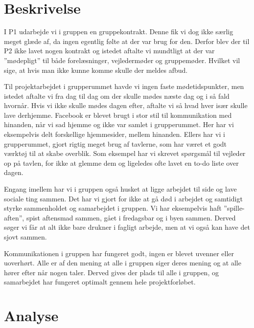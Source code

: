 \section{Beskrivelse}
I P1 udarbejde vi i gruppen en gruppekontrakt. Denne fik vi dog ikke særlig meget glæde af, da ingen egentlig følte at der var brug for den. Derfor blev der til P2 ikke lavet nogen kontrakt og istedet aftalte vi mundtligt at der var ”mødepligt” til både forelæsninger, vejledermøder og gruppemøder. Hvilket vil sige, at hvis man ikke kunne komme skulle der meldes afbud.

Til projektarbejdet i grupperummet havde vi ingen faste mødetidspunkter, men istedet aftalte vi fra dag til dag om der skulle mødes næste dag og i så fald hvornår. Hvis vi ikke skulle mødes dagen efter, aftalte vi så hvad hver især skulle lave derhjemme.
Facebook er blevet brugt i stor stil til kommunikation med hinanden, når vi sad hjemme og ikke var samlet i grupperummet. Her har vi eksempelvis delt forskellige hjemmesider, mellem hinanden. 
Ellers har vi i grupperummet, gjort rigtig meget brug af tavlerne, som har været et godt værktøj til at skabe overblik. Som eksempel har vi skrevet spørgsmål til vejleder op på tavlen, for ikke at glemme dem og ligeledes ofte lavet en to-do liste over dagen. 

Engang imellem har vi i gruppen også husket at ligge arbejdet til side og lave sociale ting sammen. Det har vi gjort for ikke at gå død i arbejdet og samtidigt styrke sammenholdet og samarbejdet i gruppen. Vi har eksempelvis haft ”spille-aften”, spist aftensmad sammen, gået i fredagsbar og i byen sammen. Derved søger vi får at alt ikke bare drukner i fagligt arbejde, men at vi også kan have det sjovt sammen.

Kommunikationen i gruppen har fungeret godt, ingen er blevet uvenner eller uoverhørt. Alle er af den mening at alle i gruppen siger deres mening og at alle hører efter når nogen taler. Derved gives der plads til alle i gruppen, og  samarbejdet har fungeret optimalt gennem hele projektforløbet.

\section{Analyse}

